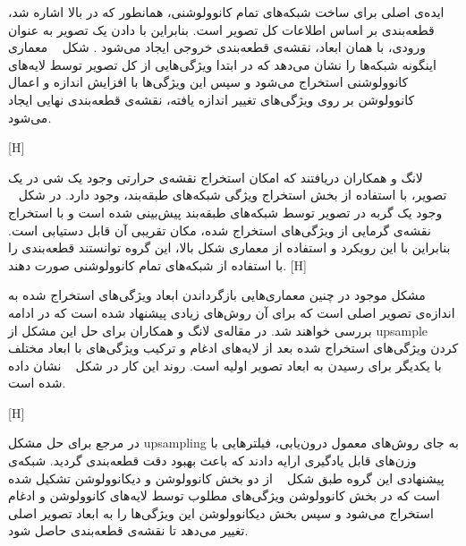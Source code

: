 ایده‌ی اصلی برای ساخت شبکه‌های تمام کانوولوشنی، همانطور که در بالا اشاره شد، قطعه‌بندی بر اساس اطلاعات کل تصویر است. بنابراین با دادن یک تصویر به عنوان ورودی، با همان ابعاد، نقشه‌ی قطعه‌بندی خروجی ایجاد می‌شود . شکل ~ معماری اینگونه شبکه‌ها را نشان می‌دهد که در ابتدا ویژگی‌هایی از کل تصویر توسط لایه‌های کانوولوشنی استخراج می‌شود و سپس این ویژگی‌ها با افزایش اندازه و اعمال کانوولوشن بر روی ویژگی‌های تغییر اندازه یافته، نقشه‌ی قطعه‌بندی نهایی ایجاد می‌شود.

[H]

لانگ و همکاران  دریافتند که امکان استخراج نقشه‌ی حرارتی وجود یک شی در یک تصویر، با استفاده از بخش استخراج ویژگی شبکه‌های طبقه‌بند، وجود دارد. در شکل ~ وجود یک گربه در تصویر توسط شبکه‌های طبقه‌بند پیش‌بینی شده است و با استخراج نقشه‌ی گرمایی از ویژگی‌های استخراج شده، مکان تقریبی آن قابل دستیابی است. بنابراین با این رویکرد و استفاده از معماری شکل بالا، این گروه توانستند قطعه‌بندی را با استفاده از شبکه‌های تمام کانوولوشنی صورت دهند. 
[H]

مشکل موجود در چنین معماری‌هایی بازگرداندن ابعاد ویژگی‌های استخراج شده به اندازه‌ی تصویر اصلی است که برای آن روش‌های زیادی پیشنهاد شده است که در ادامه بررسی خواهند شد. در مقاله‌ی لانگ و همکاران برای حل این مشکل از upsample کردن ویژگی‌های استخراج شده بعد از لایه‌های ادغام و ترکیب ویژگی‌های با ابعاد مختلف با یکدیگر برای رسیدن به ابعاد تصویر اولیه است. روند این کار در شکل ~ نشان داده شده است.

[H]

در مرجع  برای حل مشکل upsampling به جای روش‌های معمول درون‌یابی، فیلترهایی با وزن‌های قابل یادگیری ارایه دادند که باعث بهبود دقت قطعه‌بندی گردید. شبکه‌ی پیشنهادی این گروه طبق شکل ~ از دو بخش کانوولوشن و دیکانوولوشن تشکیل شده است که در بخش کانوولوشن ویژگی‌های مطلوب توسط لایه‌های کانوولوشن و ادغام استخراج می‌شود و سپس بخش دیکانوولوشن این ویژگی‌ها را به ابعاد تصویر اصلی تغییر می‌دهد تا نقشه‌ی قطعه‌بندی حاصل شود. 

